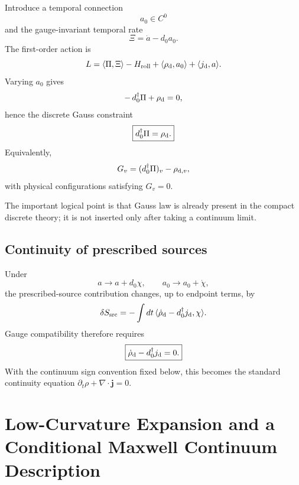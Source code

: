 \documentclass[11pt]{article}
\begin{document}
Introduce a temporal connection
\begin{equation}
a_0\in C^0
\end{equation}
and the gauge-invariant temporal rate
\begin{equation}
\boxed{
\Xi
=
\dot a-d_0a_0.
}
\end{equation}
The first-order action is
\begin{equation}
L
=
\langle\Pi,\Xi\rangle
-
H_{\rm roll}
+
\langle\rho_{\rm d},a_0\rangle
+
\langle j_{\rm d},a\rangle.
\end{equation}
Varying $a_0$ gives
\begin{equation}
-\,d_0^\dagger\Pi+\rho_{\rm d}=0,
\end{equation}
hence the discrete Gauss constraint
\begin{equation}
\boxed{
d_0^\dagger\Pi=\rho_{\rm d}.
}
\end{equation}
Equivalently,
\begin{equation}
G_v=(d_0^\dagger\Pi)_v-\rho_{{\rm d},v},
\end{equation}
with physical configurations satisfying $G_v=0$.

The important logical point is that Gauss law is already present in the compact discrete theory; it is not inserted only after taking a continuum limit.

\subsection{Continuity of prescribed sources}

Under
\begin{equation}
a\rightarrow a+d_0\chi,
\qquad
a_0\rightarrow a_0+\dot\chi,
\end{equation}
the prescribed-source contribution changes, up to endpoint terms, by
\begin{equation}
\delta S_{\rm src}
=
-\int dt\,
\langle
\dot\rho_{\rm d}-d_0^\dagger j_{\rm d},
\chi
\rangle.
\end{equation}
Gauge compatibility therefore requires
\begin{equation}
\boxed{
\dot\rho_{\rm d}-d_0^\dagger j_{\rm d}=0.
}
\end{equation}
With the continuum sign convention fixed below, this becomes the standard continuity equation $\partial_t\rho+\nabla\!\cdot\!\mathbf j=0$.

\section{Low-Curvature Expansion and a Conditional Maxwell Continuum Description}
\end{document}
